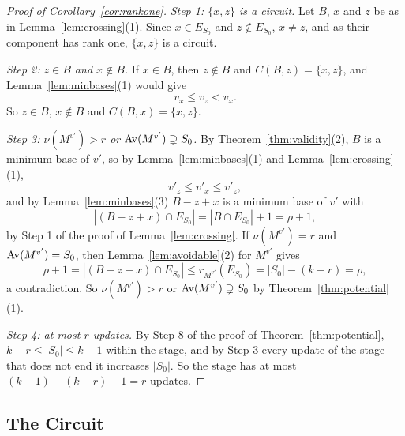\begin{proof}[Proof of Corollary~\ref{cor:rankone}]
\emph{Step 1: $\{x,z\}$ is a circuit.}  Let $B$, $x$ and $z$ be as in
Lemma~\ref{lem:crossing}(1).  Since $x\in E_{S_0}$ and $z\notin E_{S_0}$, $x\ne z$, and
as their component has rank one, $\{x,z\}$ is a circuit.

\emph{Step 2: $z\in B$ and $x\notin B$.}  If $x\in B$, then $z\notin B$ and $C(B,z)=\{x,z\}$, and
Lemma~\ref{lem:minbases}(1) would give
\[
  v_x\le v_z<v_x.
\]
So $z\in B$, $x\notin B$ and $C(B,x)=\{x,z\}$.

\emph{Step 3: $\nu(M^{v'})>r$ or $\operatorname{Av}(M^{v'})\supsetneq S_0$.}  By Theorem~\ref{thm:validity}(2), $B$ is a minimum base
of $v'$, so by Lemma~\ref{lem:minbases}(1) and Lemma~\ref{lem:crossing}(1),
\[
  v'_z\le v'_x\le v'_z,
\]
and by Lemma~\ref{lem:minbases}(3) $B-z+x$ is a minimum base of $v'$ with
\[
  |(B-z+x)\cap E_{S_0}|=|B\cap E_{S_0}|+1=\rho+1,
\]
by Step 1 of the proof of Lemma~\ref{lem:crossing}.  If $\nu(M^{v'})=r$ and
$\operatorname{Av}(M^{v'})=S_0$, then Lemma~\ref{lem:avoidable}(2) for $M^{v'}$ gives
\[
  \rho+1=|(B-z+x)\cap E_{S_0}|\le r_{M^{v'}}(E_{S_0})=|S_0|-(k-r)=\rho,
\]
a contradiction.  So $\nu(M^{v'})>r$ or $\operatorname{Av}(M^{v'})\supsetneq S_0$ by
Theorem~\ref{thm:potential}(1).

\emph{Step 4: at most $r$ updates.}  By Step 8 of the proof of Theorem~\ref{thm:potential},
$k-r\le|S_0|\le k-1$ within the stage, and by Step 3 every update of the stage
that does not end it increases $|S_0|$.  So the stage has at most
$(k-1)-(k-r)+1=r$ updates.
\end{proof}

\subsection{The Circuit}
\label{app:circuit}

